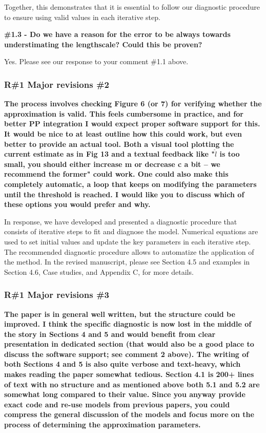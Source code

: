 \documentclass[11pt]{report}
\begin{document}
Together, this demonstrates that it is essential to follow our diagnostic procedure to ensure using valid values in each iterative step.

\textbf{\#1.3 - Do we have a reason for the error to be always towards understimating the lengthscale? Could this be proven?}

Yes. Please see our response to your comment \#1.1 above.


\subsubsection*{R\#1 Major revisions \#2}

\textbf{The process involves checking Figure 6 (or 7) for verifying whether the approximation is valid. This feels cumbersome in practice, and for better PP integration I would expect proper software support for this. It would be nice to at least outline how this could work, but even better to provide an actual tool. Both a visual tool plotting the current estimate as in Fig 13 and a textual feedback like "$\hat l$ is too small, you should either increase m or decrease c a bit -- we recommend the former" could work. One could also make this completely automatic, a loop that keeps on modifying the parameters until the threshold is reached. I would like you to discuss which of these options you would prefer and why.}

In response, we have developed and presented a diagnostic procedure that consists of iterative steps to fit and diagnose the model. Numerical equations are used to set initial values and update the key parameters in each iterative step. The recommended diagnostic procedure allows to automatize the application of the method. In the revised manuscript, please see Section 4.5 and examples in Section 4.6, Case studies, and Appendix C, for more details.

\subsubsection*{R\#1 Major revisions \#3}

\textbf{The paper is in general well written, but the structure could be improved. I think the specific diagnostic is now lost in the middle of the story in Sections 4 and 5 and would benefit from clear presentation in dedicated section (that would also be a good place to discuss the software support; see comment 2 above). The writing of both Sections 4 and 5 is also quite verbose and text-heavy, which makes reading the paper somewhat tedious. Section 4.1 is 200+ lines of text with no structure and as mentioned above both 5.1 and 5.2 are somewhat long compared to their value. Since you anyway provide exact code and re-use models from previous papers, you could compress the general discussion of the models and focus more on the process of determining the approximation parameters.}
\end{document}
